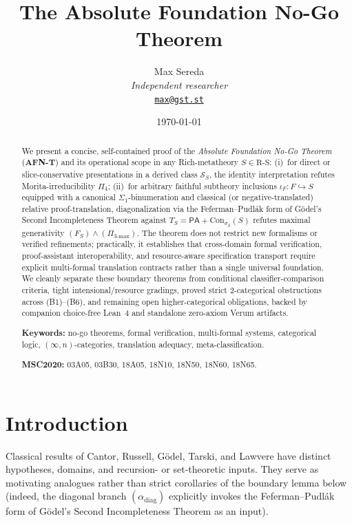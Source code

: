 \documentclass[11pt]{article}
\title{The Absolute Foundation No-Go Theorem}
\author{%
  \footnotesize Max Sereda \\[-3pt]
  \scriptsize\textit{Independent researcher} \\[-3pt]
  \scriptsize\texttt{\href{mailto:max@gst.st}{max@gst.st}}%
}
\date{\scriptsize\today}
\theoremstyle{plain}
\theoremstyle{definition}
\newcommand{\RS}{\mathrm{R\text{-}S}}
\newcommand{\cS}{\mathcal{S}}
\newcommand{\Con}{\mathrm{Con}}
\newcommand{\PA}{\mathsf{PA}}
\begin{document}
\maketitle

\begin{abstract}
We present a concise, self-contained proof of the \emph{Absolute Foundation No-Go Theorem} (\textbf{AFN-T}) and its operational scope in any Rich-metatheory $S \in \RS$: (i)~for direct or slice-conservative presentations in a derived class $\cS_S$, the identity interpretation refutes Morita-irreducibility $\Pi_4$; (ii)~for arbitrary faithful subtheory inclusions $\iota_F : F \hookrightarrow S$ equipped with a canonical $\Sigma_1$-binumeration and classical (or negative-translated) relative proof-translation, diagonalization via the Feferman--Pudl\'ak form of G\"odel's Second Incompleteness Theorem against $T_S = \PA + \Con_{\sigma_S}(S)$ refutes maximal generativity $(F_S) \wedge (\Pi_{3\text{-max}})$. The theorem does not restrict new formalisms or verified refinements; practically, it establishes that cross-domain formal verification, proof-assistant interoperability, and resource-aware specification transport require explicit multi-formal translation contracts rather than a single universal foundation. We cleanly separate these boundary theorems from conditional classifier-comparison criteria, tight intensional/resource gradings, proved strict $2$-categorical obstructions across \textup{(B1)--(B6)}, and remaining open higher-categorical obligations, backed by companion choice-free Lean~4 and standalone zero-axiom Verum artifacts.

\medskip
\noindent\textbf{Keywords:} no-go theorems, formal verification, multi-formal systems, categorical logic, $(\infty, n)$-categories, translation adequacy, meta-classification.

\noindent\textbf{MSC2020:} 03A05, 03B30, 18A05, 18N10, 18N50, 18N60, 18N65.
\end{abstract}

\tableofcontents

\section{Introduction}\label{sec:intro}

Classical results of Cantor, Russell, G\"odel, Tarski, and Lawvere have distinct hypotheses, domains, and recursion- or set-theoretic inputs. They serve as motivating analogues rather than strict corollaries of the boundary lemma below (indeed, the diagonal branch $(\alpha_{\mathrm{diag}})$ explicitly invokes the Feferman--Pudl\'ak form of G\"odel's Second Incompleteness Theorem as an input).
\end{document}
